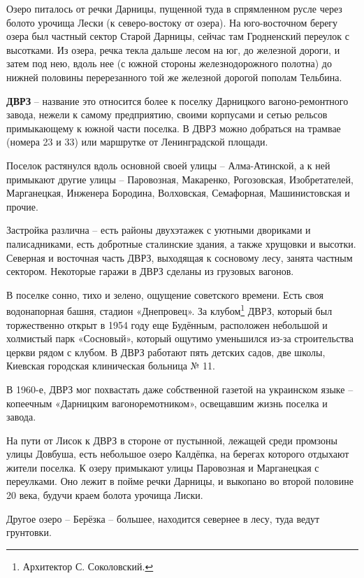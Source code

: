 Озеро питалось от речки Дарницы, пущенной туда в спрямленном русле через болото урочища Лески (к северо-востоку от озера). На юго-восточном берегу озера был частный сектор Старой Дарницы, сейчас там Гродненский переулок с высотками. Из озера, речка текла дальше лесом на юг, до железной дороги, и затем под нею, вдоль нее (с южной стороны железнодорожного полотна) до нижней половины перерезанного той же железной дорогой пополам Тельбина.\\

\medskip


\textbf{ДВРЗ} – название это относится более к поселку Дарницкого вагоно-ремонтного завода, нежели к самому предприятию, своими корпусами и сетью рельсов примыкающему к южной части поселка. В ДВРЗ можно добраться на трамвае (номера 23 и 33) или маршрутке от Ленинградской площади.

Поселок растянулся вдоль основной своей улицы – Алма-Атинской, а к ней примыкают другие улицы – Паровозная, Макаренко, Рогозовская, Изобретателей, Марганецкая, Инженера Бородина, Волховская, Семафорная, Машинистовская и прочие.

Застройка различна – есть районы двухэтажек с уютными двориками и палисадниками, есть добротные сталинские здания, а также хрущовки и высотки. Северная и восточная часть ДВРЗ, выходящая к сосновому лесу, занята частным сектором. Некоторые гаражи в ДВРЗ сделаны из грузовых вагонов.

В поселке сонно, тихо и зелено, ощущение советского времени. Есть своя водонапорная башня, стадион «Днепровец». За клубом\footnote{Архитектор С. Соколовский.} ДВРЗ, который был торжественно открыт в 1954 году еще Будённым, расположен небольшой и холмистый парк «Сосновый», который ощутимо уменьшился из-за строительства церкви рядом с клубом. В ДВРЗ работают пять детских садов, две школы, Киевская городская клиническая больница № 11.

В 1960-е, ДВРЗ мог похвастать даже собственной газетой на украинском языке – копеечным «Дарницким вагоноремотником», освещавшим жизнь поселка и завода.

На пути от Лисок к ДВРЗ в стороне от пустынной, лежащей среди промзоны улицы Довбуша, есть небольшое озеро Калдёпка, на берегах которого отдыхают жители поселка. К озеру примыкают улицы Паровозная и Марганецкая с переулками. Оно лежит в пойме речки Дарницы, и выкопано во второй половине 20 века, будучи краем болота урочища Лиски.

Другое озеро – Берёзка – большее, находится севернее в лесу, туда ведут грунтовки.

